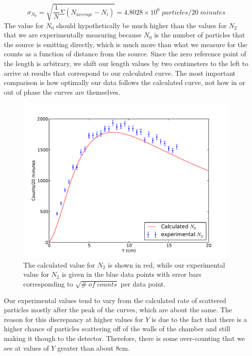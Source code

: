 \begin{equation} \sigma_{N_0}=\sqrt{\frac{1}{N}\Sigma (N_{average} - N_i)}=4.8028\times10^6\;particles/20\;minutes\end{equation}
The value for $N_0$ should hypothetically be much higher than the values for $N_2$ that we are experimentally measuring because $N_0$ is the number of particles that the source is emitting directly, which is much more than what we measure for the counts as a function of distance from the source. Since the zero reference point of the length is arbitrary, we shift our length values by two centimeters to the left to arrive at results that correspond to our calculated curve. The most important comparison is how optimally our data follows the calculated curve, not how in or out of phase the curves are themselves. 


\begin{figure}[H]
\begin{center}
\includegraphics[width=5in]{N2.pdf}
\caption{The calculated value for $N_2$ is shown in red, while our experimental value for $N_2$ is given in the blue data points with error bars corresponding to $\sqrt{\#\; of\; counts}$ per data point.}
\end{center}
\end{figure}
Our experimental values tend to vary from the calculated rate of scattered particles mostly after the peak of the curves, which are about the same. The reason for this discrepancy at higher values for $Y$ is due to the fact that there is a higher chance of particles scattering off of the walls of the chamber and still making it though to the detector. Therefore, there is some over-counting that we see at values of $Y$ greater than about 8cm.

